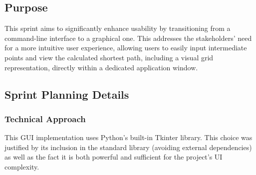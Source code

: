 \subsection{Purpose}

This sprint aims to significantly enhance usability by transitioning from a command-line interface to a graphical one. This addresses the stakeholders' need for a more intuitive user experience, allowing users to easily input intermediate points and view the calculated shortest path, including a visual grid representation, directly within a dedicated application window.

\clearpage
\subsection{Sprint Planning Details}

\subsubsection{Technical Approach}

This GUI implementation uses Python's built-in Tkinter library. This choice was justified by its inclusion in the standard library (avoiding external dependencies) as well as the fact it is both powerful and sufficient for the project's UI complexity.

